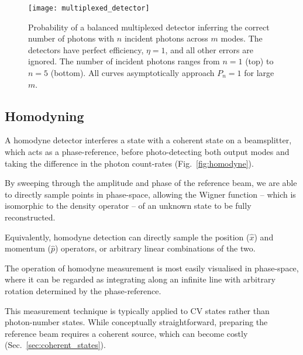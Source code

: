 \begin{figure}[htpb]
	\texttt{[image: multiplexed\_detector]}
	\caption{Probability of a balanced multiplexed detector inferring the correct number of photons with $n$ incident photons across $m$ modes. The detectors have perfect efficiency, \mbox{$\eta=1$}, and all other errors are ignored. The number of incident photons ranges from \mbox{$n=1$} (top) to \mbox{$n=5$} (bottom). All curves asymptotically approach \mbox{$P_n=1$} for large $m$.}\label{fig:multiplexed_pd}
\end{figure}

%
%

\subsection{Homodyning} \label{sec:homodyne} 

A homodyne detector interferes a state with a coherent state on a beamsplitter, which acts as a phase-reference, before photo-detecting both output modes and taking the difference in the photon count-rates (Fig.~\ref{fig:homodyne}).

By sweeping through the amplitude and phase of the reference beam, we are able to directly sample points in phase-space, allowing the Wigner function -- which is isomorphic to the density operator -- of an unknown state to be fully reconstructed.

Equivalently, homodyne detection can directly sample the position ($\hat x$) and momentum ($\hat p$) operators, or arbitrary linear combinations of the two. 

The operation of homodyne measurement is most easily visualised in phase-space, where it can be regarded as integrating along an infinite line with arbitrary rotation determined by the phase-reference.

This measurement technique is typically applied to CV states rather than photon-number states. While conceptually straightforward, preparing the reference beam requires a coherent source, which can become costly (Sec.~\ref{sec:coherent_states}).

